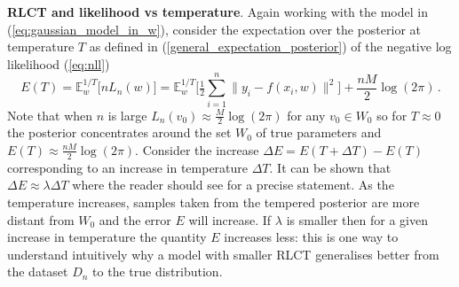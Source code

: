 \documentclass{article} %
\def\lto{\longrightarrow}
\begin{document}
\textbf{RLCT and likelihood vs temperature}. 
Again working with the model in (\ref{eq:gaussian_model_in_w}), consider the expectation over the posterior at temperature $T$ as defined in (\ref{general_expectation_posterior}) of the negative log likelihood (\ref{eq:nll})
$$
E(T) = \mathbb{E}^{1/T}_w\big[nL_n(w) \big] = \mathbb{E}_w^{1/T}\Big[ \tfrac{1}{2} \sum_{i=1}^n \| y_i - f(x_i, w) \|^2 \Big] + \frac{nM}{2} \log(2\pi)\,.
$$
Note that when $n$ is large $L_n(v_0) \approx \frac{M}{2} \log(2\pi)$ for any $v_0 \in W_0$ so for $T \approx 0$ the posterior concentrates around the set $W_0$ of true parameters and $E(T) \approx \frac{nM}{2} \log(2\pi)$. Consider the increase $\Delta E = E(T + \Delta T) - E(T)$ corresponding to an increase in temperature $\Delta T$. It can be shown that 
$
\Delta E \approx \lambda \Delta T
$
where the reader should see \citep[Corollary 3]{watanabe_widely_2013} for a precise statement. As the temperature increases, samples taken from the tempered posterior are more distant from $W_0$ and the error $E$ will increase. If $\lambda$ is smaller then for a given increase in temperature the quantity $E$ increases less: this is one way to understand intuitively why a model with smaller RLCT generalises better from the dataset $D_n$ to the true distribution.


\end{document}
